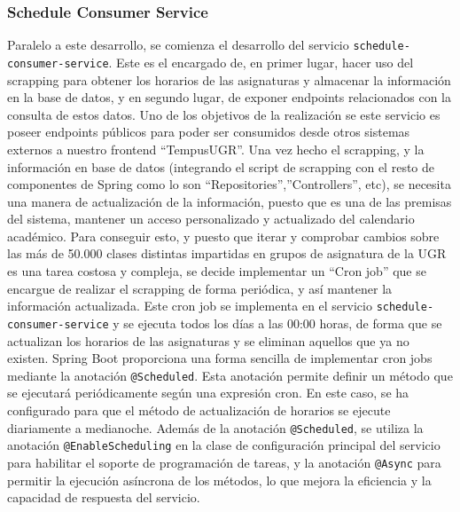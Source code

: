 \subsubsection{Schedule Consumer Service}
Paralelo a este desarrollo, se comienza el desarrollo del servicio \texttt{schedule-consumer-service}. Este es el encargado de, en primer lugar, hacer uso del scrapping para obtener los horarios de las asignaturas y almacenar la información en la base de datos, y en segundo lugar, de exponer endpoints relacionados con la consulta de estos datos. Uno de los objetivos de la realización se este servicio es poseer endpoints públicos para poder ser consumidos desde otros sistemas externos a nuestro frontend ``TempusUGR''.
\newline\newline
Una vez hecho el scrapping, y la información en base de datos (integrando el script de scrapping con el resto de componentes de Spring como lo son ``Repositories'',''Controllers'', etc), se necesita una manera de actualización de la información, puesto que es una de las premisas del sistema, mantener un acceso personalizado y actualizado del calendario académico.\newline
Para conseguir esto, y puesto que iterar y comprobar cambios sobre las más de 50.000 clases distintas impartidas en grupos de asignatura de la UGR es una tarea costosa y compleja, se decide implementar un ``\hypertarget{cronjob}{Cron job}'' que se encargue de realizar el scrapping de forma periódica, y así mantener la información actualizada. Este cron job se implementa en el servicio \texttt{schedule-consumer-service} y se ejecuta todos los días a las 00:00 horas, de forma que se actualizan los horarios de las asignaturas y se eliminan aquellos que ya no existen.
\newline\newline
Spring Boot proporciona una forma sencilla de implementar cron jobs mediante la anotación \texttt{@Scheduled}. Esta anotación permite definir un método que se ejecutará periódicamente según una expresión cron. En este caso, se ha configurado para que el método de actualización de horarios se ejecute diariamente a medianoche. Además de la anotación \texttt{@Scheduled}, se utiliza la anotación \texttt{@EnableScheduling} en la clase de configuración principal del servicio para habilitar el soporte de programación de tareas, y la anotación \texttt{@Async} para permitir la ejecución asíncrona de los métodos, lo que mejora la eficiencia y la capacidad de respuesta del servicio.
\newline
